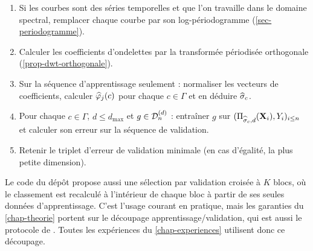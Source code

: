 \begin{enumerate}[label=\arabic*.]
  \item Si les courbes sont des séries temporelles et que l'on travaille dans le domaine spectral, remplacer chaque courbe par son log-périodogramme (\cref{sec-periodogramme}).
  \item Calculer les coefficients d'ondelettes par la transformée périodisée orthogonale (\cref{prop-dwt-orthogonale}).
  \item Sur la séquence d'apprentissage seulement : normaliser les vecteurs de coefficients, calculer $\widehat{\varphi}_j(c)$ pour chaque $c\in\Gamma$ et en déduire $\widehat{\sigma}_c$.
  \item Pour chaque $c\in\Gamma$, $d\le d_{\max}$ et $g\in\mathcal{D}_n^{(d)}$ : entraîner $g$ sur $(\Pi_{\widehat{\sigma}_c,d}(\mathbf{X}_i),Y_i)_{i\le n}$ et calculer son erreur sur la séquence de validation.
  \item Retenir le triplet d'erreur de validation minimale (en cas d'égalité, la plus petite dimension).
\end{enumerate}

\begin{remarque}
Le code du dépôt propose aussi une sélection par validation croisée à $K$ blocs, où le classement est recalculé à l'intérieur de chaque bloc à partir de ses seules données d'apprentissage. C'est l'usage courant en pratique, mais les garanties du \cref{chap-theorie} portent sur le découpage apprentissage/validation, qui est aussi le protocole de \citet{berlinet2008functional}. Toutes les expériences du \cref{chap-experiences} utilisent donc ce découpage.
\end{remarque}
